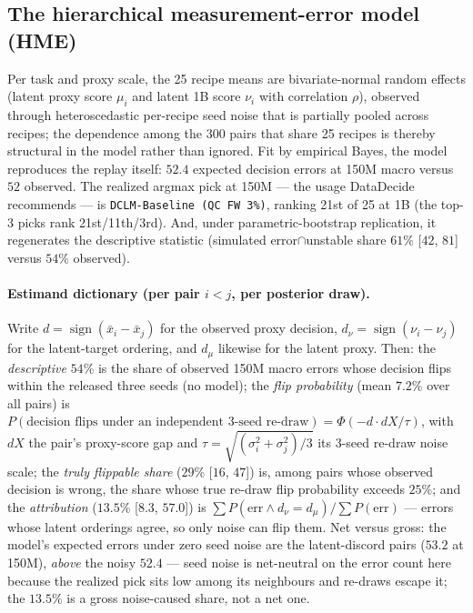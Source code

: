 \subsection{The hierarchical measurement-error model (HME)}
\label{app:t3-hme}

Per task and proxy scale, the 25 recipe means are bivariate-normal random effects (latent proxy score
$\mu_i$ and latent 1B score $\nu_i$ with correlation $\rho$), observed through heteroscedastic
per-recipe seed noise that is partially pooled across recipes; the dependence among the 300 pairs
that share 25 recipes is thereby structural in the model rather than ignored. Fit by empirical
Bayes, the model reproduces the replay itself: $52.4$ expected decision errors at 150M macro versus
$52$ observed. The realized argmax pick at 150M --- the usage DataDecide recommends --- is
\texttt{DCLM-Baseline (QC FW 3\%)}, ranking 21st of 25 at 1B (the top-3 picks rank
21st/11th/3rd). And, under parametric-bootstrap replication, it regenerates the descriptive
statistic (simulated error$\cap$unstable share $61\%$ [$42$, $81$] versus $54\%$ observed).

\paragraph{Estimand dictionary (per pair $i{<}j$, per posterior draw).} Write
$d = \operatorname{sign}(\bar x_i - \bar x_j)$ for the observed proxy decision, $d_\nu =
\operatorname{sign}(\nu_i - \nu_j)$ for the latent-target ordering, and $d_\mu$ likewise for
the latent proxy. Then: the \emph{descriptive} $54\%$ is the share of observed 150M macro
errors whose decision flips within the released three seeds (no model); the \emph{flip
probability} (mean $7.2\%$ over all pairs) is $P(\text{decision flips under an independent
3-seed re-draw}) = \Phi(-d\cdot dX/\tau)$, with $dX$ the pair's proxy-score
gap and $\tau = \sqrt{(\sigma_i^2 + \sigma_j^2)/3}$ its 3-seed re-draw noise scale; the \emph{truly flippable share} ($29\%$
[$16$, $47$]) is, among pairs whose observed decision is wrong, the share whose true re-draw
flip probability exceeds $25\%$; and the \emph{attribution} ($13.5\%$ [$8.3$, $57.0$]) is
$\sum P(\mathrm{err} \wedge d_\nu = d_\mu) / \sum P(\mathrm{err})$ --- errors whose
latent orderings agree, so only noise can flip them. Net versus gross: the model's expected
errors under zero seed noise are the latent-discord pairs ($53.2$ at 150M), \emph{above} the
noisy $52.4$ --- seed noise is net-neutral on the error count here because the realized pick
sits low among its neighbours and re-draws escape it; the $13.5\%$ is a gross noise-caused share, not a net one.

